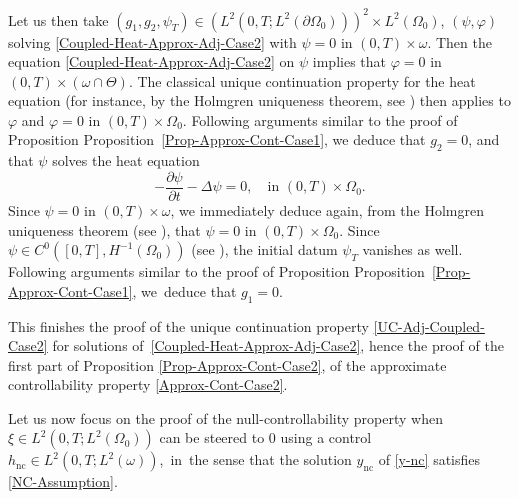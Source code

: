 \documentclass[JEP,XML,SOM,Unicode,NoFloatCountersInSection]{cedram}
\newcommand{\nc}{\mathrm{nc}}
\theoremstyle{definition}
\begin{document}
Let us then take $(g_1, g_2, \psi_T) \in (L^2(0,T; L^2(\partial\Omega_0)))^2\times L^2(\Omega_0)$, $(\psi, \varphi)$ solving \eqref{Coupled-Heat-Approx-Adj-Case2} with $\psi = 0$ in $(0,T) \times \omega$. Then the equation \eqref{Coupled-Heat-Approx-Adj-Case2} on $\psi$ implies that $\varphi = 0$ in $(0,T)\times {(\omega\cap \Theta)}$. The classical unique continuation property for the heat equation (for instance, by the Holmgren uniqueness theorem, see \eg \cite[\S8.6 \& Th.\,8.6.5]{Hormander-2003}) then applies to $\varphi$ and $\varphi = 0$ in $(0,T)\times \Omega_0$. Following arguments similar to the proof of Proposition Proposition~\ref{Prop-Approx-Cont-Case1}, we deduce that $g_2 = 0$, and that $\psi$ solves the heat equation
\[
-\dfrac{\partial \psi}{\partial t}-\Delta \psi =0, \quad \text{in }(0,T) \times \Omega_0.
\]
Since $\psi = 0$ in $(0,T) \times \omega$, we immediately deduce again, from the Holmgren uniqueness theorem (see \eg \cite[\S8.6 \& Th.\,8.6.5]{Hormander-2003}), that $\psi = 0$ in $(0,T) \times \Omega_0$. Since $\psi\in C^0([0,T],H^{-1}(\Omega_0))$ (see \eg \cite[Prop.\,7.1.3]{TWBook}), the initial datum $\psi_T$ vanishes as well. Following arguments similar to the proof of Proposition Proposition~\ref{Prop-Approx-Cont-Case1}, we~deduce that $g_1 = 0$.

This finishes the proof of the unique continuation property \eqref{UC-Adj-Coupled-Case2} for solutions of~\eqref{Coupled-Heat-Approx-Adj-Case2}, hence the proof of the first part of Proposition \ref{Prop-Approx-Cont-Case2}, \ie of the approximate controllability property \eqref{Approx-Cont-Case2}.

Let us now focus on the proof of the null-controllability property when~$\xi\in L^2(0,T; L^2(\Omega_0))$ can be steered to $0$ using a control $h_{\nc} \!\in\! L^2(0,T; L^2(\omega))$,~in~the sense that the solution $y_{\nc}$ of \eqref{y-nc} satisfies \eqref{NC-Assumption}.
\end{document}
